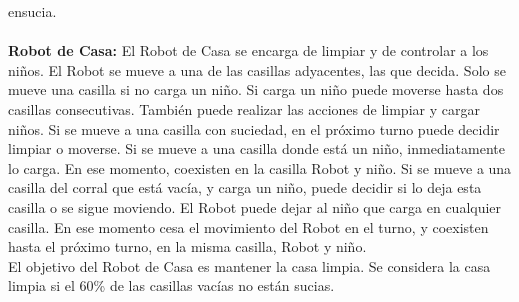 \documentclass[a4paper,10pt]{article}
\begin{document}
  ensucia.\\\\
   \textbf{Robot de Casa:} El Robot de Casa se encarga de limpiar y de controlar a los ni\~nos. El Robot se mueve a una de las casillas adyacentes, las que decida. Solo se mueve una casilla si no carga un ni\~no. Si carga un ni\~no puede moverse hasta dos casillas consecutivas. Tambi\'en puede realizar las acciones de limpiar y cargar ni\~nos. Si se mueve a una casilla con suciedad, en el pr\'oximo turno puede decidir limpiar o moverse. Si se mueve a una casilla donde est\'a un ni\~no, inmediatamente lo carga. En ese momento, coexisten en la casilla Robot y ni\~no. Si se mueve a una casilla del corral que est\'a vac\'ia, y carga un ni\~no, puede decidir si lo deja esta casilla o se sigue moviendo. El Robot puede dejar al ni\~no que carga en cualquier casilla. En ese momento cesa el movimiento del Robot en el turno, y coexisten hasta el pr\'oximo turno, en la misma casilla, Robot y ni\~no.\\
  
  El objetivo del Robot de Casa es mantener la casa limpia. Se considera la casa limpia si el 60\% de las casillas vac\'ias no est\'an sucias.\\
\end{document}
